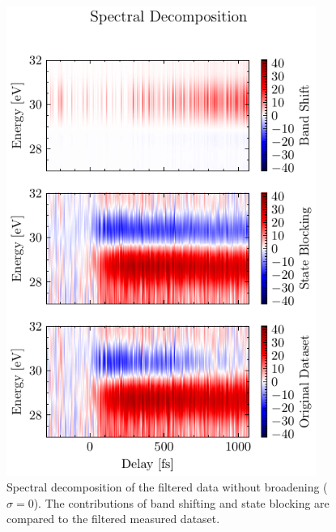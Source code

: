 \begin{figure}
	\centering
	\includegraphics[width=0.9\textwidth]{figures/chap4/spectral_decomp1.pdf}
	\caption{Spectral decomposition of the filtered data without broadening ($\sigma=0$). The contributions of band shifting and state blocking are compared to the filtered measured dataset.}
	\label{fig:spectral_decomp1}
\end{figure}


